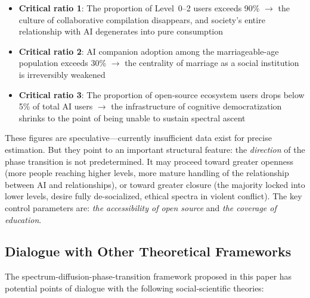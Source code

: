 ﻿\documentclass[12pt,a4paper]{article}
\begin{document}
\begin{itemize}
\item \textbf{Critical ratio 1}: The proportion of Level~0--2 users exceeds 90\% ${}\to{}$ the culture of collaborative compilation disappears, and society's entire relationship with AI degenerates into pure consumption
\item \textbf{Critical ratio 2}: AI companion adoption among the marriageable-age population exceeds 30\% ${}\to{}$ the centrality of marriage as a social institution is irreversibly weakened
\item \textbf{Critical ratio 3}: The proportion of open-source ecosystem users drops below 5\% of total AI users ${}\to{}$ the infrastructure of cognitive democratization shrinks to the point of being unable to sustain spectral ascent
\end{itemize}

These figures are speculative---currently insufficient data exist for precise estimation. But they point to an important structural feature: the \emph{direction} of the phase transition is not predetermined. It may proceed toward greater openness (more people reaching higher levels, more mature handling of the relationship between AI and relationships), or toward greater closure (the majority locked into lower levels, desire fully de-socialized, ethical spectra in violent conflict). The key control parameters are: \emph{the accessibility of open source} and \emph{the coverage of education}.

\subsection{Dialogue with Other Theoretical Frameworks}

The spectrum-diffusion-phase-transition framework proposed in this paper has potential points of dialogue with the following social-scientific theories:
\end{document}
